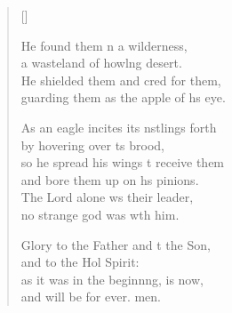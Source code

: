 \begin{verse}[\versewidth]
\begin{patverse}
He found them \pointup{\i}n a wilderness,\Med\\
a wasteland of howl\pointup{\i}ng desert.\\
He shielded them and cred for them,\Med\\
guarding them as the apple of h\pointup{\i}s eye.

As an eagle incites its nstlings forth\Med\\
by hovering over \pointup{\i}ts brood,\\
so he spread his wings t receive them\Med\\
and bore them up on h\pointup{\i}s pinions.\\
The Lord alone ws their leader,\Med\\
no strange god was w\pointup{\i}th him.

Glory to the Father and t the Son,\Med\\
and to the Hol Spirit:\\
as it was in the beginn\pointup{\i}ng, is now,\Med\\
and will be for ever. men.
  \end{patverse}
\end{verse}

